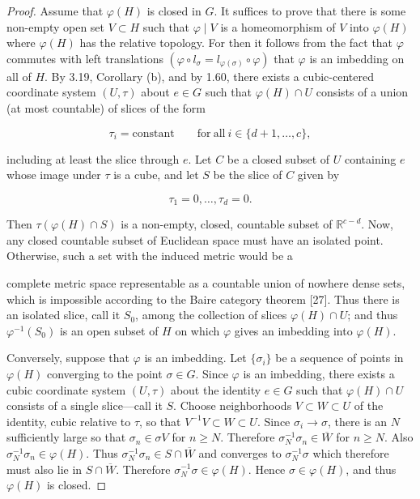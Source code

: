 \begin{proof}
Assume that $\varphi(H)$ is closed in $G$. It suffices to prove that there is some non-empty open set $V \subset H$ such that $\varphi \mid V$ is a homeomorphism of $V$ into $\varphi(H)$ where $\varphi(H)$ has the relative topology. For then it follows from the fact that $\varphi$ commutes with left translations $(\varphi\circ l_{\sigma}=l_{\varphi(\sigma)}\circ\varphi)$ that $\varphi$ is an imbedding on all of $H$. By 3.19, Corollary (b), and by 1.60, there exists a cubic-centered coordinate system $(U, \tau)$ about $e \in G$ such that $\varphi(H) \cap U$ consists of a union (at most countable) of slices of the form

\begin{equation}
\tag{1}\label{eq:3.21:1}
\tau_{i}=\mathrm{constant}\qquad\mathrm{for~all~}i\in\{d+1,\ldots,c\},
\end{equation}

including at least the slice through $e$. Let $C$ be a closed subset of $U$ containing $e$ whose image under $\tau$ is a cube, and let $S$ be the slice of $C$ given by

\begin{equation}
\tag{2}\label{eq:3.21:2}
\tau_{1}=0,\ldots,\tau_{d}=0.
\end{equation}

\begin{center}
\end{center}

Then  $ \tau(\varphi(H) \cap S) $ is a non-empty, closed, countable subset of  $ \mathbb{R}^{c-d} $. Now, any closed countable subset of Euclidean space must have an isolated point. Otherwise, such a set with the induced metric would be a

complete metric space representable as a countable union of nowhere dense sets, which is impossible according to the Baire category theorem [27]. Thus there is an isolated slice, call it $S_0$, among the collection of slices $\varphi(H) \cap U$; and thus $\varphi^{-1}(S_0)$ is an open subset of $H$ on which $\varphi$ gives an imbedding into $\varphi(H)$.

Conversely, suppose that $\varphi$ is an imbedding. Let $\{\sigma_i\}$ be a sequence of points in $\varphi(H)$ converging to the point $\sigma \in G$. Since $\varphi$ is an imbedding, there exists a cubic coordinate system $(U, \tau)$ about the identity $e \in G$ such that $\varphi(H) \cap U$ consists of a single slice—call it $S$. Choose neighborhoods $V \subset W \subset U$ of the identity, cubic relative to $\tau$, so that $V^{-1}V \subset W \subset U$. Since $\sigma_i \to \sigma$, there is an $N$ sufficiently large so that $\sigma_n \in \sigma V$ for $n \geq N$. Therefore $\sigma_N^{-1} \sigma_n \in \overline{W}$ for $n \geq N$. Also $\sigma_N^{-1} \sigma_n \in \varphi(H)$. Thus $\sigma_N^{-1} \sigma_n \in S \cap \overline{W}$ and converges to $\sigma_N^{-1} \sigma$ which therefore must also lie in $S \cap \overline{W}$. Therefore $\sigma_N^{-1} \sigma \in \varphi(H)$. Hence $\sigma \in \varphi(H)$, and thus $\varphi(H)$ is closed.

\end{proof}

